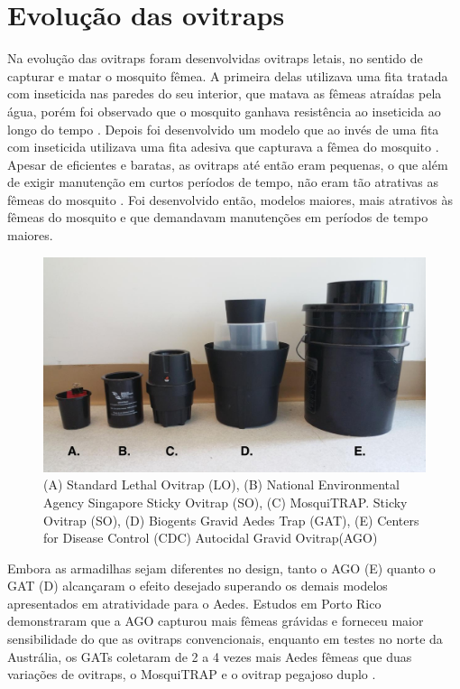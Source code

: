 \documentclass[
	12pt,				%
	openright,			%
	oneside,			%
	a4paper,			%
	chapter=TITLE,		%
	english,			%
	brazil				%
	]{abntex2}
\begin{document}
\section{Evolução das ovitraps}

Na evolução das ovitraps foram desenvolvidas ovitraps letais, no sentido de capturar e matar o mosquito fêmea. A primeira delas utilizava uma fita
tratada com inseticida nas paredes do seu interior, que matava as fêmeas atraídas pela
água, porém foi observado que o mosquito ganhava resistência ao inseticida ao longo do
tempo \cite{BRIANJJOHNSON2017}. Depois foi desenvolvido um modelo que ao invés de uma fita com inseticida
utilizava uma fita adesiva que capturava a fêmea do mosquito \cite{BRIANJJOHNSON2017}. Apesar de eficientes e 
baratas, as ovitraps até então eram pequenas, o que além de exigir manutenção em curtos
períodos de tempo, não eram tão atrativas as fêmeas do mosquito \cite{BRIANJJOHNSON2017}. Foi desenvolvido
então, modelos maiores, mais atrativos às fêmeas do mosquito e que demandavam
manutenções em períodos de tempo maiores.

\begin{figure}[H]
\centering
\includegraphics[scale=0.3]{imagens/exemplosovitraps.png}
 \caption{(A) Standard Lethal Ovitrap (LO), (B) National Environmental Agency Singapore Sticky Ovitrap (SO), (C) MosquiTRAP. 
 Sticky Ovitrap (SO), (D) Biogents Gravid Aedes Trap (GAT), (E) Centers for Disease Control (CDC) Autocidal Gravid Ovitrap(AGO)}
    \label{fig:evolucaoOvitraps}
\end{figure}

Embora as armadilhas sejam diferentes no design, tanto o AGO (E) quanto o GAT (D)
alcançaram o efeito desejado superando os demais modelos apresentados em atratividade para o Aedes.
Estudos em Porto Rico demonstraram que a AGO capturou mais fêmeas grávidas e
forneceu maior sensibilidade do que as ovitraps convencionais, enquanto em testes no norte da 
Austrália, os GATs coletaram de 2 a 4 vezes mais Aedes fêmeas que
duas variações de ovitraps, o MosquiTRAP e o ovitrap pegajoso duplo \cite{BRIANJJOHNSON2017}. 
\end{document}
